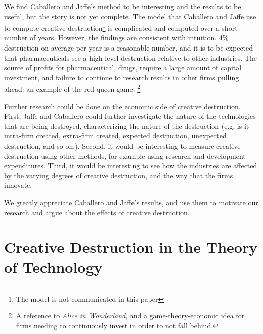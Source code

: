 \documentclass[11pt]{article}
\begin{document}
We find Caballero and Jaffe's method to be interesting and the results to be useful, but the story is not yet complete.
The model that Caballero and Jaffe use to compute creative destruction\footnote{The model is not communicated in this paper} is complicated and computed over a short number of years.
However, the findings are consistent with intuition.
4\% destruction on average per year is a reasonable number, and it is to be expected that pharmaceuticals see a high level destruction relative to other industries. 
The source of profits for pharmaceutical, drugs, require a large amount of capital investment, and failure to continue to research results in other firms pulling ahead: an example of the red queen game.
\footnote{A reference to \textit{Alice in Wonderland}, and a game-theory-economic idea for firms needing to continuously invest in order to not fall behind.}

Further research could be done on the economic side of creative destruction.
First, Jaffe and Caballero could further investigate the nature of the technologies that are being destroyed, characterizing the nature of the destruction (e.g. is it intra-firm created, extra-firm created, expected destruction, unexpected destruction, and so on.).
Second, it would be interesting to measure creative destruction using other methods, for example using research and development expenditures.
Third, it would be interesting to see how the industries are affected by the varying degrees of creative destruction, and the way that the firms innovate.

We greatly appreciate Caballero and Jaffe's results, and use them to motivate our research and argue about the effects of creative destruction.

\section{Creative Destruction in the Theory of Technology}
\end{document}
